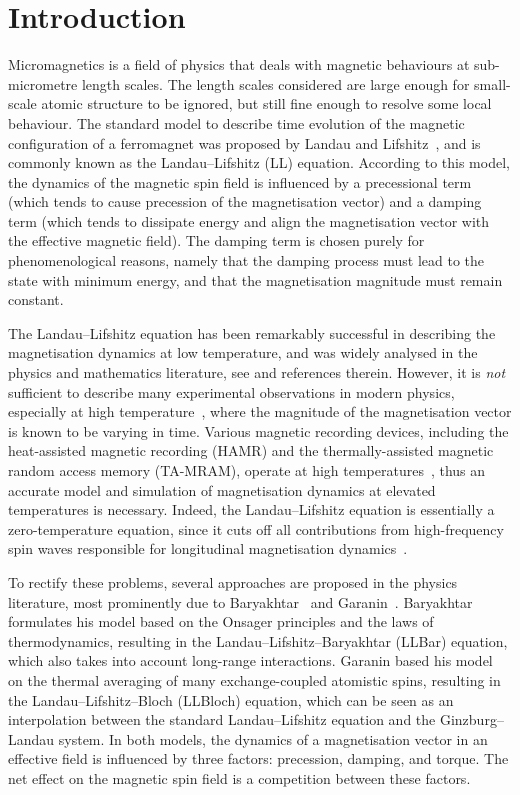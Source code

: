 \documentclass[11pt, reqno]{amsart}
\theoremstyle{definition}
\theoremstyle{remark}
\numberwithin{equation}{section}
\begin{document}
\section{Introduction}\label{sec:intro}
Micromagnetics is a field of physics that deals with magnetic behaviours at sub-micrometre length scales. The length scales considered are large enough for small-scale atomic structure to be ignored, but still fine enough to resolve some local behaviour. The standard model to describe time evolution of the magnetic configuration of a ferromagnet was proposed by Landau and Lifshitz~\cite{LL35}, and is commonly known as the Landau--Lifshitz (LL) equation. According to this model, the dynamics of the magnetic spin field is influenced by a precessional term (which tends to cause precession of the magnetisation vector) and a damping term (which tends to dissipate energy and align the magnetisation vector with the effective magnetic field). The damping term is chosen purely for phenomenological reasons, namely that the damping process must lead to the state with minimum energy, and that the magnetisation magnitude must remain constant.

The Landau--Lifshitz equation has been remarkably successful in describing the magnetisation dynamics at low temperature, and was widely analysed in the physics and mathematics literature, see \cite{AloSoy92, CarFab01, Cim08, GuoDing08, Lak11, Vis85} and references therein. However, it is \emph{not} sufficient to describe many experimental observations in modern physics, especially at high temperature~\cite{Bar84, ChuNowChaGar06, DvoVanVan13, Gar91, Gar97, WanDvo15}, where the magnitude of the magnetisation vector is known to be varying in time. Various magnetic recording devices, including the heat-assisted magnetic recording (HAMR) and the thermally-assisted magnetic random access memory (TA-MRAM), operate at high temperatures~\cite{MeoPan20, NieChu16, WanDvo15}, thus an accurate model and simulation of magnetisation dynamics at elevated temperatures is necessary. Indeed, the Landau--Lifshitz equation is essentially a zero-temperature equation, since it cuts off all contributions from high-frequency spin waves responsible for longitudinal magnetisation dynamics~\cite{ChuNie20}.

To rectify these problems, several approaches are proposed in the physics literature, most prominently due to Baryakhtar~\cite{BarBar98, Bar84} and Garanin~\cite{Gar91, Gar97}. Baryakhtar formulates his model based on the Onsager principles and the laws of thermodynamics, resulting in the Landau--Lifshitz--Baryakhtar (LLBar) equation, which also takes into account long-range interactions. Garanin based his model on the thermal averaging of many exchange-coupled atomistic spins, resulting in the Landau--Lifshitz--Bloch (LLBloch) equation, which can be seen as an interpolation between the standard Landau--Lifshitz equation and the Ginzburg--Landau system. In both models, the dynamics of a magnetisation vector in an effective field is influenced by three factors: precession, damping, and torque. The net effect on the magnetic spin field is a competition between these factors.
\end{document}
